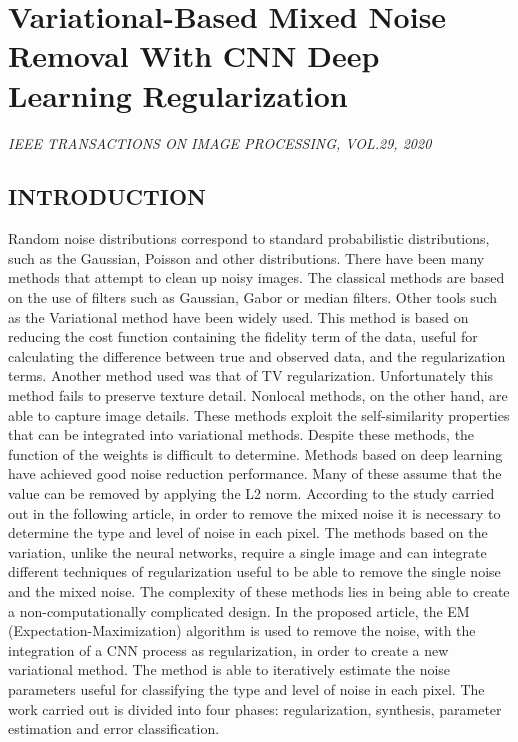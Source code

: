 \section{Variational-Based Mixed Noise Removal With CNN Deep Learning Regularization}

\begin{center}
    \author{
    Faqiang Wang,
    Haiyang Huang,
    Jun Liu
    }
\end{center}

\begin{center}
    \emph{IEEE TRANSACTIONS ON IMAGE PROCESSING, VOL.29, 2020}
\end{center}

\subsection{INTRODUCTION}
Random noise distributions correspond to standard probabilistic distributions, 
such as the Gaussian, Poisson and other distributions. There have 
been many methods that attempt to clean up noisy images. The classical 
methods are based on the use of filters such as Gaussian, Gabor or median 
filters. Other tools such as the Variational method have been widely used. 
This method is based on reducing the cost function containing the fidelity 
term of the data, useful for calculating the difference between true and observed 
data, and the regularization terms. Another method used was that of 
TV regularization. Unfortunately this method fails to preserve texture detail. 
Nonlocal methods, on the other hand, are able to capture image details. 
These methods exploit the self-similarity properties that can be integrated 
into variational methods. Despite these methods, the function of the weights 
is difficult to determine. Methods based on deep learning have achieved good 
noise reduction performance. Many of these assume that the value can be 
removed by applying the L2 norm. According to the study carried out in 
the following article, in order to remove the mixed noise it is necessary to 
determine the type and level of noise in each pixel. The methods based on 
the variation, unlike the neural networks, require a single image and can 
integrate different techniques of regularization useful to be able to remove 
the single noise and the mixed noise. The complexity of these methods lies 
in being able to create a non-computationally complicated design. In the 
proposed article, the EM (Expectation-Maximization) algorithm is used to 
remove the noise, with the integration of a CNN process as regularization, 
in order to create a new variational method. The method is able to iteratively 
estimate the noise parameters useful for classifying the type and level 
of noise in each pixel. The work carried out is divided into four phases: 
regularization, synthesis, parameter estimation and error classification.

